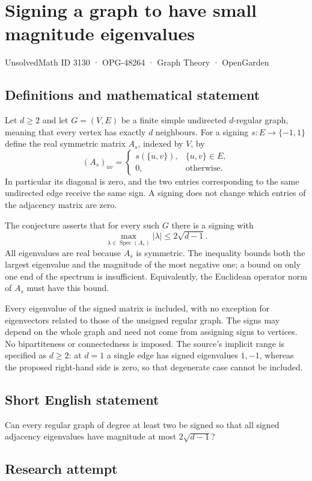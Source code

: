\documentclass[11pt,a4paper]{article}
\begin{document}
\section*{Signing a graph to have small magnitude eigenvalues}\label{3130}
{\small UnsolvedMath ID 3130 · OPG-48264 · Graph Theory · OpenGarden}
\subsection{Definitions and mathematical statement}
Let $d\ge2$ and let $G=(V,E)$ be a finite simple undirected $d$-regular
graph, meaning that every vertex has exactly $d$ neighbours.
For a signing $s:E\to\{-1,1\}$ define the real symmetric matrix
$A_s$, indexed by $V$, by
\[
 (A_s)_{uv}=\begin{cases}s(\{u,v\}),&\{u,v\}\in E,\\
                         0,&\text{otherwise}.\end{cases}
\]
In particular its diagonal is zero, and the two entries corresponding
to the same undirected edge receive the same sign. A signing does not
change which entries of the adjacency matrix are zero.

The conjecture asserts that for every such $G$ there is a signing with
\[
 \max_{\lambda\in\operatorname{Spec}(A_s)}|\lambda|
                 \le2\sqrt{d-1}.
\]
All eigenvalues are real because $A_s$ is symmetric. The inequality
bounds both the largest eigenvalue and the magnitude of the most
negative one; a bound on only one end of the spectrum is insufficient.
Equivalently, the Euclidean operator norm of $A_s$ must have this bound.

Every eigenvalue of the signed matrix is included, with no exception
for eigenvectors related to those of the unsigned regular graph.
The signs may depend on the whole graph and need not come from
assigning signs to vertices. No bipartiteness or connectedness is imposed.
The source's implicit range is specified as $d\ge2$: at $d=1$ a single
edge has signed eigenvalues $1,-1$, whereas the proposed right-hand
side is zero, so that degenerate case cannot be included.
\subsection{Short English statement}
Can every regular graph of degree at least two be signed so that all signed adjacency eigenvalues have magnitude at most $2\sqrt{d-1}$?
\subsection{Research attempt}
\end{document}
